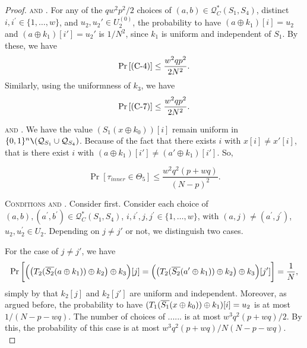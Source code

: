 \begin{proof}
\smallskip
\noindent \textsc{\cfour and \cseven}. For any of the $qw^2p^2/2$ choices of $(a, b) \in \mathcal{Q}_{C}^{*}\left(S_{1}, S_{4}\right)$, distinct $i, i^{\prime}\in\{1, \ldots, w\}$, and $u_{2},u_{2}' \in U_{2}^{(0)}$, the probability to have $(a \oplus k_1)[i] = u_2$ and $(a \oplus k_1)[i'] = u_2'$ is $1/N^2$, since $k_1$ is uniform and independent of $S_1$. By these, we have
%
$$
\operatorname{Pr}\left[\text{(C-4)}\right] \leq \frac{w^2qp^2}{2N^2}.
$$
Similarly, using the uniformness of $k_3$, we have
%
$$
\operatorname{Pr}\left[\text{(C-7)}\right] \leq \frac{w^2qp^2}{2N^2}.
$$



\smallskip
\noindent\textsc{\cfive and \ceight}. We have the value $\left(S_{1}\left(x \oplus k_{0}\right)\right)[i]$ remain uniform in $\{0, 1\}^{n} \verb|\| (\mathcal{Q}_{S_{1}} \cup \mathcal{Q}_{S_{4}})$.  Because of the fact that there exists $i$ with $x[i]\neq x'[i]$, that is there exist $i$ with $\left(a \oplus k_{1}\right)[i'] \neq \left(a' \oplus k_{1}\right)[i']$. So,

$$
\operatorname{Pr}\left[\tau_{inner} \in \Theta_{5}\right] \leq \frac{w^{2} q^{2} (p+w q)}{(N-p)^2}.
$$





\smallskip
\noindent\textsc{Conditions \csix and \cnine}. Consider \csix first.  Consider each choice of
$(a, b), (a^{\prime}, b^{\prime}) \in \mathcal{Q}_{C}^{*}\left(S_{1}, S_{4}\right)$, $i, i^{\prime},j, j^{\prime} \in\{1, \ldots, w\}$, with $(a, j) \neq \left(a^{\prime}, j^{\prime}\right)$, $u_{2}, u_{2}^{\prime} \in U_{2}$. Depending on $j\neq j'$ or not, we distinguish two cases.


For the case of $j\neq j'$, we have
%
$$\Pr\bigg[\Big(\big(T_2(\overline{S_2}(a\oplus k_1))\oplus k_2\big)\oplus k_3\Big)[j]=\Big(\big(T_2(\overline{S_2}(a'\oplus k_1))\oplus k_2\big)\oplus k_3\Big)[j']\bigg]=\frac{1}{N},$$
simply by that $k_2[j]$ and $k_2[j']$ are uniform and independent. Moreover, as argued before, the probability to have $(T_1(\overline{S_1}(x\oplus k_0))\oplus k_1)[i]=u_2$ is at most $1/(N-p-wq)$. The number of choices of ...... is at most $w^3q^2(p+wq)/2$. By this, the probability of this case is at most $w^3q^2(p+wq)/N(N-p-wq)$.	\\




\end{proof}
